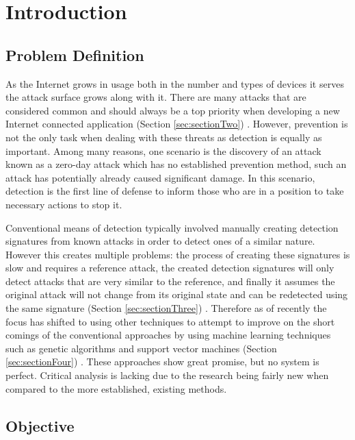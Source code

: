 \chapter{Introduction}
\section{Problem Definition}\label{sec:probDefinition}

As the Internet grows in usage both in the number and types of devices it serves the attack surface grows along with it.  There are many attacks that are considered common and should always be a top priority when developing a new Internet connected application (Section \ref{sec:sectionTwo}) \cite{trendMicro, aSurveyOnWeb}.  However, prevention is not the only task when dealing with these threats as detection is equally as important.  Among many reasons, one scenario is the discovery of an attack known as a zero-day attack which has no established prevention method, such an attack has potentially already caused significant damage.  In this scenario, detection is the first line of defense to inform those who are in a position to take necessary actions to stop it.

Conventional means of detection typically involved manually creating detection signatures from known attacks in order to detect ones of a similar nature.  However this creates multiple problems: the process of creating these signatures is slow and requires a reference attack, the created detection signatures will only detect attacks that are very similar to the reference, and finally it assumes the original attack will not change from its original state and can be redetected using the same signature (Section \ref{sec:sectionThree}) \cite{onTheVerification, metaHunting, metaInvincible}.  Therefore as of recently the focus has shifted to using other techniques to attempt to improve on the short comings of the conventional approaches by using machine learning techniques such as genetic algorithms and support vector machines (Section \ref{sec:sectionFour}) \cite{testingNetworkBased, mainPaper, intrusionDetectionCostBased, intrusionDetectionNeural}.  These approaches show great promise, but no system is perfect.  Critical analysis is lacking due to the research being fairly new when compared to the more established, existing methods.

\section{Objective}\label{sec:objectives}


